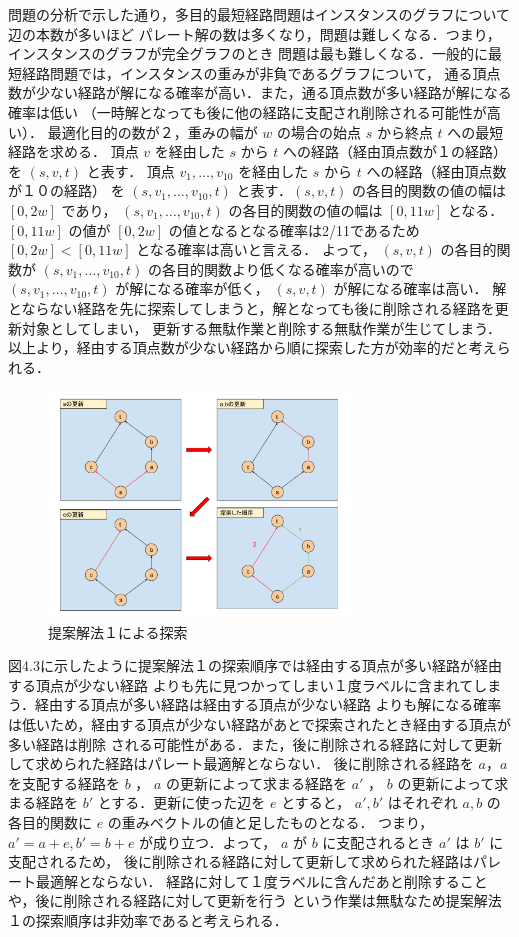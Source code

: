 \documentclass[12pt]{optlab-bachelor}
\begin{document}
問題の分析で示した通り，多目的最短経路問題はインスタンスのグラフについて辺の本数が多いほど
パレート解の数は多くなり，問題は難しくなる．つまり，インスタンスのグラフが完全グラフのとき
問題は最も難しくなる．一般的に最短経路問題では，インスタンスの重みが非負であるグラフについて，
通る頂点数が少ない経路が解になる確率が高い．また，通る頂点数が多い経路が解になる確率は低い
（一時解となっても後に他の経路に支配され削除される可能性が高い）．
最適化目的の数が２，重みの幅が $w$ の場合の始点 $s$ から終点 $t$ への最短経路を求める．
頂点 $v$ を経由した $s$ から $t$ への経路（経由頂点数が１の経路）を $(s,v,t)$ と表す．
頂点 $v_1,\ldots,v_10$ を経由した $s$ から $t$ への経路（経由頂点数が１０の経路）
を $(s,v_1,\ldots,v_10,t)$ と表す．$(s,v,t)$ の各目的関数の値の幅は $[0,2w]$ であり，
 $(s,v_1,\ldots,v_10,t)$ の各目的関数の値の幅は $[0,11w]$ となる．
$[0,11w]$ の値が $[0,2w]$ の値となるとなる確率は2/11であるため $[0,2w]<[0,11w]$ となる確率は高いと言える．
よって， $(s,v,t)$ の各目的関数が $(s,v_1,\ldots,v_10,t)$ の各目的関数より低くなる確率が高いので
 $(s,v_1,\ldots,v_10,t)$ が解になる確率が低く， $(s,v,t)$ が解になる確率は高い．
解とならない経路を先に探索してしまうと，解となっても後に削除される経路を更新対象としてしまい，
更新する無駄作業と削除する無駄作業が生じてしまう．
以上より，経由する頂点数が少ない経路から順に探索した方が効率的だと考えられる．


\begin{figure}[htbp]
  \centering
  \caption{提案解法１による探索}
  \includegraphics[height=6.0cm, width=8.0cm]{fig/fig6.pdf}
\end{figure}

図4.3に示したように提案解法１の探索順序では経由する頂点が多い経路が経由する頂点が少ない経路
よりも先に見つかってしまい１度ラベルに含まれてしまう．経由する頂点が多い経路は経由する頂点が少ない経路
よりも解になる確率は低いため，経由する頂点が少ない経路があとで探索されたとき経由する頂点が多い経路は削除
される可能性がある．また，後に削除される経路に対して更新して求められた経路はパレート最適解とならない．
後に削除される経路を $a$，$a$ を支配する経路を $b$ ， $a$ の更新によって求まる経路を $a'$ ， $b$ の更新によって求まる経路を $b'$
とする．更新に使った辺を $e$ とすると， $a',b'$ はそれぞれ $a,b$ の各目的関数に $e$ の重みベクトルの値と足したものとなる．
つまり， $a'=a+e,b'=b+e$ が成り立つ．よって， $a$ が $b$ に支配されるとき $a'$ は $b'$ に支配されるため，
後に削除される経路に対して更新して求められた経路はパレート最適解とならない．
経路に対して１度ラベルに含んだあと削除することや，後に削除される経路に対して更新を行う
という作業は無駄なため提案解法１の探索順序は非効率であると考えられる．
\end{document}
